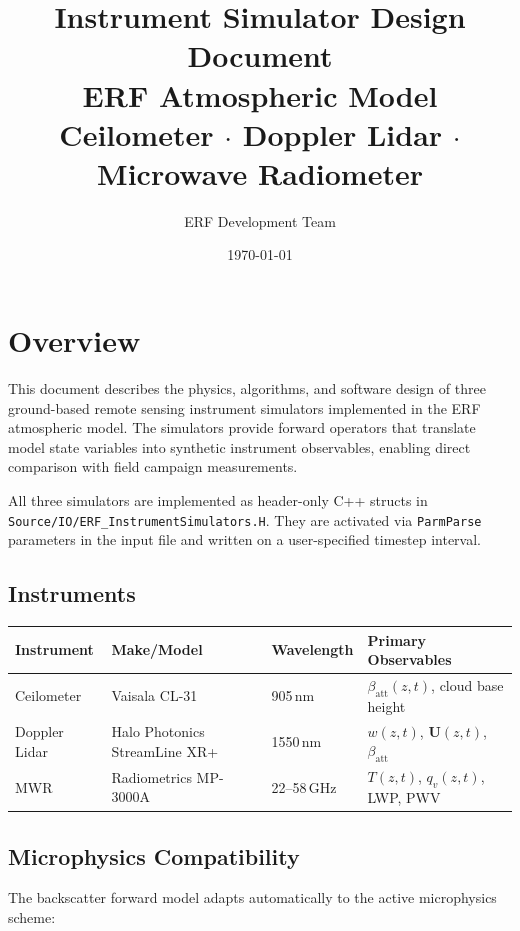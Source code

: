 \documentclass[11pt,letterpaper]{article}
\title{\textbf{Instrument Simulator Design Document}\\
\large ERF Atmospheric Model\\
\normalsize Ceilometer $\cdot$ Doppler Lidar $\cdot$ Microwave Radiometer}
\author{ERF Development Team}
\date{\today}
\begin{document}
\maketitle
\tableofcontents
\newpage

\section{Overview}

This document describes the physics, algorithms, and software design of three ground-based
remote sensing instrument simulators implemented in the ERF atmospheric model.
The simulators provide forward operators that translate model state variables into
synthetic instrument observables, enabling direct comparison with field campaign measurements.

All three simulators are implemented as header-only C++ structs in
\texttt{Source/IO/ERF\_InstrumentSimulators.H}.
They are activated via \texttt{ParmParse} parameters in the input file and
written on a user-specified timestep interval.

\subsection{Instruments}

\begin{center}
\begin{tabular}{llll}
\toprule
\textbf{Instrument} & \textbf{Make/Model} & \textbf{Wavelength} & \textbf{Primary Observables} \\
\midrule
Ceilometer & Vaisala CL-31 & 905\,nm & $\beta_\mathrm{att}(z,t)$, cloud base height \\
Doppler Lidar & Halo Photonics StreamLine XR+ & 1550\,nm & $w(z,t)$, $\mathbf{U}(z,t)$, $\beta_\mathrm{att}$ \\
MWR & Radiometrics MP-3000A & 22--58\,GHz & $T(z,t)$, $q_v(z,t)$, LWP, PWV \\
\bottomrule
\end{tabular}
\end{center}

\subsection{Microphysics Compatibility}

The backscatter forward model adapts automatically to the active microphysics scheme:
\end{document}
